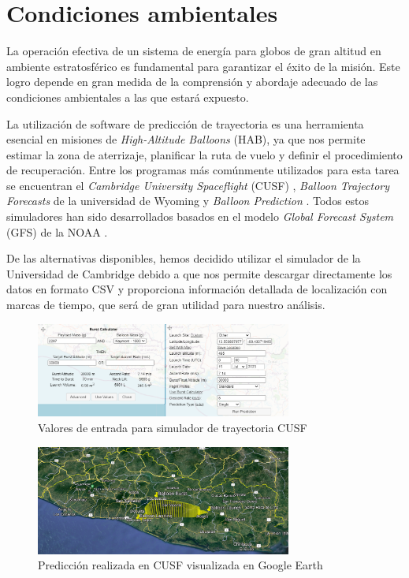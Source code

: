 
\section{Condiciones ambientales}

La operación efectiva de un sistema de energía para globos de gran altitud en ambiente estratosférico es fundamental para garantizar el éxito de la misión. Este logro depende en gran medida de la comprensión y abordaje adecuado de las condiciones ambientales a las que estará expuesto.

La utilización de software de predicción de trayectoria es una herramienta esencial en misiones de \emph{High-Altitude Balloons }(HAB), ya que nos permite estimar la zona de aterrizaje, planificar la ruta de vuelo y definir el procedimiento de recuperación. Entre los programas más comúnmente utilizados para esta tarea se encuentran el \emph{Cambridge University Spaceflight} (CUSF) \cite{Cambridge}, \emph{Balloon Trajectory Forecasts} de la universidad de Wyoming \cite{uwyo_balloon_traj} y \emph{Balloon Prediction } \cite{noaa_wvap_sw}. Todos estos simuladores han sido desarrollados basados en el modelo \emph{Global Forecast System} (GFS) de la NOAA \cite{NOAA2023}.

De las alternativas disponibles, hemos decidido utilizar el simulador de la Universidad de Cambridge debido a que nos permite descargar directamente los datos en formato CSV y proporciona información detallada de localización con marcas de tiempo, que será de gran utilidad para nuestro análisis.


\begin{figure}[hbt!]
\centering
\includegraphics[width=0.75\textwidth]{Pictures/SimulacionParametros.png}
\caption{Valores de entrada para simulador de trayectoria CUSF }\label{fig:SimuladorParametros}
\end{figure}

\begin{figure}[hbt!]
\centering
\includegraphics[width=0.75\textwidth]{Pictures/ruta.png}
\caption{Predicción realizada en CUSF visualizada en Google Earth }\label{fig:ruta}
\end{figure}

